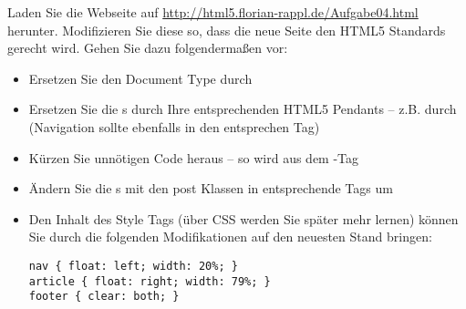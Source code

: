 %
\par Laden Sie die Webseite auf \url{http://html5.florian-rappl.de/Aufgabe04.html} herunter. Modifizieren Sie diese so, dass die neue Seite den HTML5 Standards gerecht wird. Gehen Sie dazu folgendermaßen vor:
%
\begin{itemize}
\item Ersetzen Sie den Document Type durch 
\item Ersetzen Sie die s durch Ihre entsprechenden HTML5 Pendants – z.B.  durch  (Navigation sollte ebenfalls in den entsprechen Tag)
\item Kürzen Sie unnötigen Code heraus – so wird aus dem -Tag 
\item Ändern Sie die s mit den post Klassen in entsprechende  Tags um
\item Den Inhalt des Style Tags (über CSS werden Sie später mehr lernen) können Sie durch die folgenden Modifikationen auf den neuesten Stand bringen:
%
\begin{lstlisting}
nav { float: left; width: 20%; }
article { float: right; width: 79%; }
footer { clear: both; }
\end{lstlisting}
%
\end{itemize}